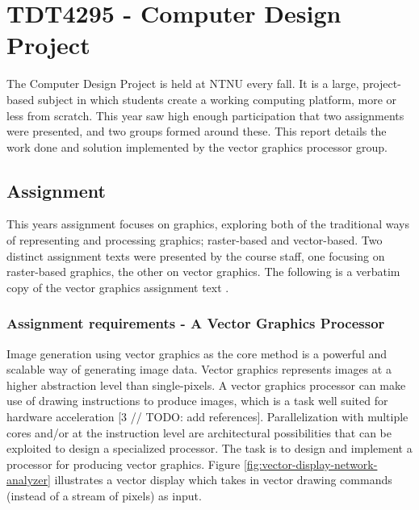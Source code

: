 \chapter{TDT4295 - Computer Design Project}
\label{sec:intro}

The Computer Design Project is held at NTNU every fall.
It is a large, project-based subject in which students create a working computing platform, more or less from scratch.
This year saw high enough participation that two assignments were presented, and two groups formed around these.
This report details the work done and solution implemented by the vector graphics processor group.

\section{Assignment}

This years assignment focuses on graphics, exploring both of the traditional ways of representing and processing graphics; raster-based and vector-based.
Two distinct assignment texts were presented by the course staff, one focusing on raster-based graphics, the other on vector graphics.
The following is a verbatim copy of the vector graphics assignment text \cite{assignment-text}.

\subsection{Assignment requirements - A Vector Graphics Processor}

Image generation using vector graphics as the core method is a powerful and scalable way of generating image data.
Vector graphics represents images at a higher abstraction level than single-pixels.
A vector graphics processor can make use of drawing instructions to produce images, which is a task well suited for hardware acceleration [3 // TODO: add references].
Parallelization with multiple cores and/or at the instruction level are architectural possibilities that can be exploited to design a specialized processor.
The task is to design and implement a processor for producing vector graphics.
Figure \ref{fig:vector-display-network-analyzer} illustrates a vector display which takes in vector drawing commands (instead of a stream of pixels) as input.

